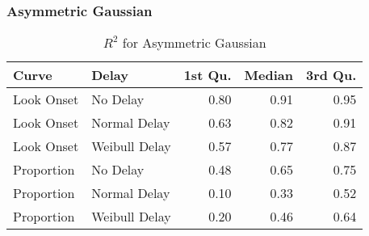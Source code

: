 \subsubsection{Asymmetric Gaussian}

\begin{table}[H]
\centering
\begin{tabular}{llrrr}
  \hline
Curve & Delay & 1st Qu. & Median & 3rd Qu. \\ 
  \hline
Look Onset & No Delay & 0.80 & 0.91 & 0.95 \\ 
  Look Onset & Normal Delay & 0.63 & 0.82 & 0.91 \\ 
  Look Onset & Weibull Delay & 0.57 & 0.77 & 0.87 \\ 
  Proportion & No Delay & 0.48 & 0.65 & 0.75 \\ 
  Proportion & Normal Delay & 0.10 & 0.33 & 0.52 \\ 
  Proportion & Weibull Delay & 0.20 & 0.46 & 0.64 \\ 
   \hline
\end{tabular}
\caption{$R^2$ for Asymmetric Gaussian}
\label{tab:r2_dg_sims}
\end{table}
